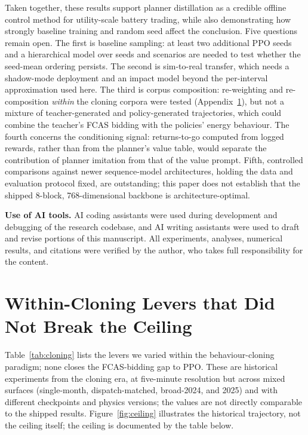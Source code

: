 \documentclass{article}
\begin{document}
Taken together, these results support planner distillation as a credible offline
control method for utility-scale battery trading, while also demonstrating how
strongly baseline training and random seed affect the conclusion. Five
questions remain open. The first is baseline sampling: at least two additional
PPO seeds and a hierarchical model over seeds and scenarios are needed to test
whether the seed-mean ordering persists. The second is sim-to-real transfer,
which needs a shadow-mode deployment and an impact model beyond the
per-interval approximation used here. The third is corpus composition:
re-weighting and
re-composition \emph{within} the cloning corpora were tested
(Appendix~\ref{app:ceiling}), but not a mixture of teacher-generated and
policy-generated trajectories, which could combine the teacher's FCAS bidding
with the policies' energy behaviour. The fourth concerns the conditioning signal:
returns-to-go computed from logged rewards, rather than from the planner's
value table, would separate the contribution of planner imitation from that of
the value prompt. Fifth, controlled comparisons against newer sequence-model
architectures, holding the data and evaluation protocol fixed, are outstanding; this paper does not establish that the shipped 8-block,
768-dimensional backbone is architecture-optimal.

\begin{ack}
\textbf{Use of AI tools.} AI coding assistants were used during development and
debugging of the research codebase, and AI writing assistants were used to draft
and revise portions of this manuscript. All experiments, analyses, numerical
results, and citations were verified by the author, who takes full responsibility
for the content.
\end{ack}




\appendix
\section{Within-Cloning Levers that Did Not Break the Ceiling}
\label{app:ceiling}

Table~\ref{tab:cloning} lists the levers we varied within the behaviour-cloning
paradigm; none closes the FCAS-bidding gap to PPO. These are historical
experiments from the cloning era, at five-minute resolution but across mixed
surfaces (single-month, dispatch-matched, broad-2024, and 2025) and with
different checkpoints and physics versions; the values are not directly
comparable to the shipped results. Figure~\ref{fig:ceiling} illustrates the
historical trajectory, not the ceiling itself; the ceiling is documented by the
table below.
\end{document}

